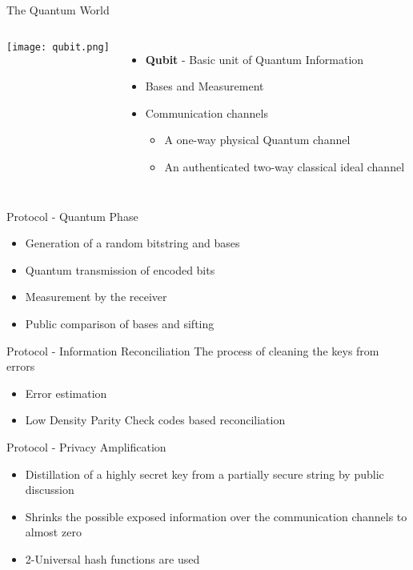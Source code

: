 \documentclass{beamer}
\begin{document}
\begin{frame}{The Quantum World}
     \begin{columns}
                \centering
                \texttt{[image: qubit.png]}
            \begin{itemize}[<+->]
                \item \textbf{Qubit} - Basic unit of Quantum Information
                \item Bases and Measurement
                \item Communication channels
                      \begin{itemize}
                            \item A one-way physical Quantum channel
                            \item An authenticated two-way classical ideal channel
                      \end{itemize}
                \end{itemize}
    \end{columns}
\end{frame}


\begin{frame}{Protocol - Quantum Phase}
    \begin{itemize}[<+->]
        \item Generation of a random bitstring and bases 
		\item Quantum transmission of encoded bits
		\item Measurement by the receiver
		\item Public comparison of bases and sifting
	\end{itemize}
\end{frame}


\begin{frame}{Protocol - Information Reconciliation}
	The process of cleaning the keys from errors
	\begin{itemize}[<+->]
		\item Error estimation
		\item Low Density Parity Check codes based reconciliation
	\end{itemize}
\end{frame}


\begin{frame}{Protocol - Privacy Amplification}
	\begin{itemize}[<+->]
	    \item Distillation of a highly secret key from a partially secure string by public discussion
		\item Shrinks the possible exposed information over the communication channels to almost zero
		\item 2-Universal hash functions are used
	\end{itemize}
\end{frame}
\end{document}
